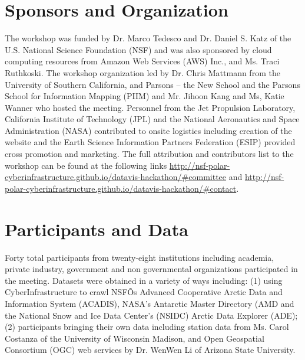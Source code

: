\documentclass[11pt]{article}
\begin{document}
\section{Sponsors and Organization}
The workshop was funded by Dr. Marco Tedesco and Dr. Daniel S. Katz of the U.S. National Science Foundation (NSF) and was also sponsored by cloud computing resources from Amazon Web Services (AWS) Inc., and Ms. Traci Ruthkoski. The workshop organization led by Dr. Chris Mattmann from the University of Southern California, and Parsons -- the New School and the Parsons School for Information Mapping (PIIM) and Mr. Jihoon Kang and Ms, Katie Wanner who hosted the meeting. Personnel from the Jet Propulsion Laboratory, California Institute of Technology (JPL) and the National Aeronautics and Space Administration (NASA) contributed to onsite logistics including creation of the website and the Earth Science Information Partners Federation (ESIP) provided cross promotion and marketing. The full attribution and contributors list to the workshop can be found at the following links \url{http://nsf-polar-cyberinfrastructure.github.io/datavis-hackathon/#committee} and \url{http://nsf-polar-cyberinfrastructure.github.io/datavis-hackathon/#contact}. 


\section{Participants and Data}
Forty total participants from twenty-eight institutions including academia, private industry, government and non governmental organizations participated in the meeting. Datasets were obtained in a variety of ways including: (1) using CyberInfrastructure to crawl NSFÕs Advanced Cooperative Arctic Data and Information System (ACADIS), NASA's Antarctic Master Directory (AMD and the National Snow and Ice Data Center's (NSIDC) Arctic Data Explorer (ADE);  (2) participants bringing their own data including station data from Ms. Carol Costanza of the University of Wisconsin Madison, and Open Geospatial Consortium (OGC) web services by Dr. WenWen Li of Arizona State University. 
\end{document}
